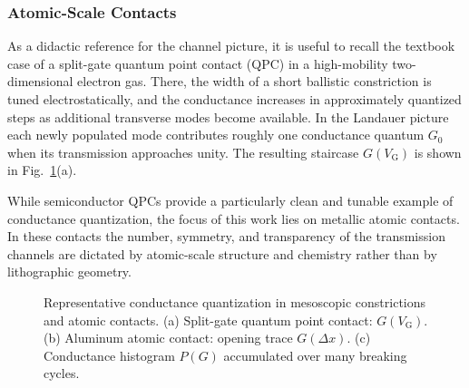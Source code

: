         \subsubsection*{Atomic-Scale Contacts}

            As a didactic reference for the channel picture, it is useful to recall the textbook case of a split-gate quantum point contact (QPC) in a high-mobility two-dimensional electron gas. There, the width of a short ballistic constriction is tuned electrostatically, and the conductance increases in approximately quantized steps as additional transverse modes become available. In the Landauer picture each newly populated mode contributes roughly one conductance quantum $G_0$ when its transmission approaches unity. The resulting staircase $G(V_\mathrm{G})$ is shown in Fig.~\ref{fig:basics:atomic-contact}(a). \cite{van_wees_quantized_1988, buttiker_four-terminal_1986, beenakker_random-matrix_1997}

            While semiconductor QPCs provide a particularly clean and tunable example of conductance quantization, the focus of this work lies on metallic atomic contacts. In these contacts the number, symmetry, and transparency of the transmission channels are dictated by atomic-scale structure and chemistry rather than by lithographic geometry.

            \begin{figure}
                \centering
                \hfill
                \hfill

                \caption{
                    Representative conductance quantization in mesoscopic constrictions and atomic contacts.
                (a) Split-gate quantum point contact: $G(V_\mathrm{G})$.
                (b) Aluminum atomic contact: opening trace $G(\Delta x)$.
                (c) Conductance histogram $P(G)$ accumulated over many breaking cycles.
                }
                \label{fig:basics:atomic-contact}
            \end{figure}

